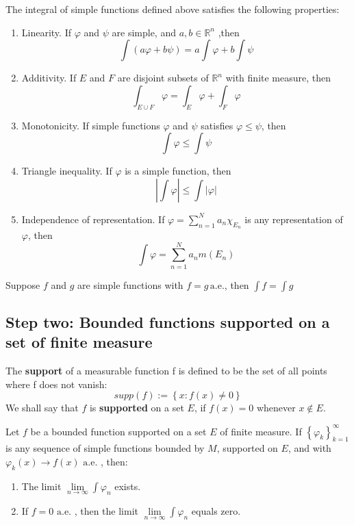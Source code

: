 \documentclass{ctexbook}
\begin{document}
\begin{prop}
    \label{int: simple prop}
    The integral of simple functions defined above satisfies the following properties:
    \begin{enumerate}
        \item Linearity. If $\varphi$ and $\psi$ are simple, and $a,b \in \mathbb{R}^n$ ,then \[\int (a\varphi + b\psi) = a\int\varphi + b\int\psi\]
        \item Additivity. If $E$ and $F$ are disjoint subsets of $\mathbb{R}^n$ with finite measure, then\[\int_{E\cup F}\varphi = \int_E\varphi+\int_F\varphi\]
        \item Monotonicity. If simple functions $\varphi$ and $\psi$ satisfies $\varphi \leq \psi$, then \[\int\varphi \leq \int\psi\]
        \item Triangle inequality. If $\varphi$ is a simple function, then \[\left\lvert \int\varphi\right\rvert \leq \int\left\lvert \varphi\right\rvert\]
        \item Independence of representation. If $\varphi = \sum_{n=1}^N a_n\chi_{E_n}$ is any representation of $\varphi$, then \[\int\varphi = \sum_{n=1}^N a_nm(E_n)\] 
    \end{enumerate}
\end{prop}

\begin{fact}
    Suppose $f$ and $g$ are simple functions with $f=g\,\text{a.e.}$, then $\int f=\int g$
\end{fact}

\subsection{Step two: Bounded functions supported on a set of finite measure}

\begin{define}[support]
    The \textbf{support} of a measurable function f is defined to be the set of all points where f does not vanish:
    \[supp(f):=\left\{x: f(x) \neq 0\right\} \]
    We shall say that $f$ is \textbf{supported} on a set $E$, if $f(x) = 0$ whenever $x\notin E$.
\end{define}

\begin{lema}
    \label{int: bounded conv}
    Let $f$ be a bounded function supported on a set $E$ of finite measure. If $\left\{\varphi_k\right\}_{k=1}^\infty$ is any
    sequence of simple functions bounded by $M$, supported on $E$, and with $\varphi_k(x) \rightarrow f(x) \text{ a.e. }$, then:
    \begin{enumerate}
        \item The limit $\lim\limits_{n\rightarrow\infty}\int\varphi_n$ exists.
        \item If $f=0 \text{ a.e. }$, then the limit $\lim\limits_{n\rightarrow\infty}\int\varphi_n$ equals zero.
    \end{enumerate}
\end{lema}
\end{document}
